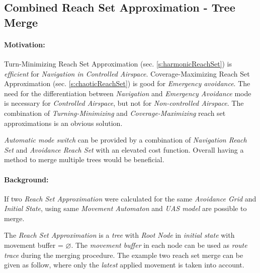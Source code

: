\subsection{Combined Reach Set Approximation - Tree Merge}\label{s:combinedReachSet}
\paragraph{Motivation:} Turn-Minimizing Reach Set Approximation (sec. \ref{s:harmonicReachSet}) is \emph{efficient} for \emph{Navigation in \emph{Controlled Airspace}}. Coverage-Maximizing Reach Set Approximation (sec. \ref{s:chaoticReachSet}) is good for \emph{Emergency avoidance}. The need for the differentiation between \emph{Navigation} and \emph{Emergency Avoidance} mode is necessary for \emph{Controlled Airspace}, but not for \emph{Non-controlled Airspace}. The combination of \emph{Turning-Minimizing} and \emph{Coverage-Maximizing} reach set approximations is an obvious solution. 

\emph{Automatic mode switch} can be provided by a combination of \emph{Navigation Reach Set} and \emph{Avoidance Reach Set} with an elevated cost function. Overall having a method to merge multiple trees would be beneficial.

\paragraph{Background:} If two \emph{Reach Set Approximation} were calculated for the same \emph{Avoidance Grid} and \emph{Initial State}, using same \emph{Movement Automaton} and \emph{UAS model} are possible to merge. 

The \emph{Reach Set Approximation} is a \emph{tree} with \emph{Root Node} in \emph{initial state} with movement buffer = $\varnothing$. The \emph{movement buffer} in each node can be used as \emph{route trace} during the merging procedure. The example two reach set merge can be given as follow, where only the \emph{latest} applied movement is taken into account.

